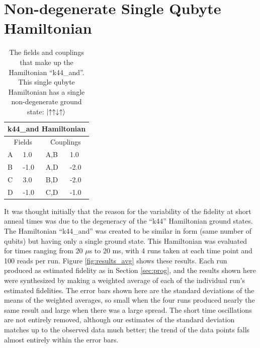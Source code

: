 \section{Non-degenerate Single Qubyte Hamiltonian}

\begin{table}
	\begin{center}
\begin{tabular}{ | l | l | l | l |}
	\hline
	\multicolumn{4}{|c|}{k44\_and Hamiltonian} \\ \hline
	\multicolumn{2}{|c|}{Fields} & \multicolumn{2}{c|}{Couplings} \\ \hline
	A & 1.0 & A,B & 1.0 \\
	B & -1.0 & A,D & -2.0 \\
	C & 3.0 & B,D & -2.0 \\
	D & -1.0 & C,D & -1.0 \\ \hline
\end{tabular}
\end{center}
\caption[k44\_and Hamiltonian]{The fields and couplings that make up the Hamiltonian ``k44\_and''.  This single qubyte Hamiltonian has a single non-degenerate ground state: $\mathinner{|{\uparrow\uparrow\downarrow\uparrow}\rangle}$ }
\label{tab:k44_and}
\end{table}
It was thought initially that the reason for the variability of the fidelity at short anneal times was due to the degeneracy of the ``k44'' Hamiltonian ground states.  The Hamiltonian ``k44\_and'' was created to be similar in form (same number of qubits) but having only a single ground state.  This Hamiltonian was evaluated for times ranging from 20 $\mu$s to 20 ms, with 4 runs taken at each time point and 100 reads per run.  Figure \ref{fig:results_avg} shows these results.  Each run produced as estimated fidelity as in Section \ref{sec:prog}, and the results shown here were synthesized by making a weighted average of each of the individual run's estimated fidelities.  The error bars shown here are the standard deviations of the means of the weighted averages, so small when the four runs produced nearly the same result and large when there was a large spread.  The short time oscillations are not entirely removed, although our estimates of the standard deviation matches up to the observed data much better; the trend of the data points falls almost entirely within the error bars.

